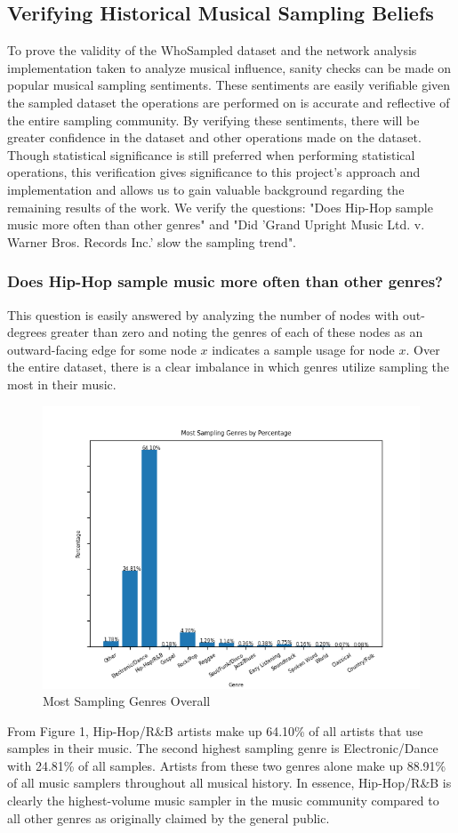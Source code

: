 \documentclass[pageno]{jpaper}
\begin{document}
\subsection{Verifying Historical Musical Sampling Beliefs}
To prove the validity of the WhoSampled dataset and the network analysis implementation taken to analyze musical influence, sanity checks can be made on popular musical sampling sentiments. These sentiments are easily verifiable given the sampled dataset the operations are performed on is accurate and reflective of the entire sampling community. By verifying these sentiments, there will be greater confidence in the dataset and other operations made on the dataset. Though statistical significance is still preferred when performing statistical operations, this verification gives significance to this project's approach and implementation and allows us to gain valuable background regarding the remaining results of the work. We verify the questions: "Does Hip-Hop sample music more often than other genres" and "Did 'Grand Upright Music Ltd. v. Warner Bros. Records Inc.' slow the sampling trend".
\subsubsection{Does Hip-Hop sample music more often than other genres?}
This question is easily answered by analyzing the number of nodes with out-degrees greater than zero and noting the genres of each of these nodes as an outward-facing edge for some node $x$ indicates a sample usage for node $x$. Over the entire dataset, there is a clear imbalance in which genres utilize sampling the most in their music. 
\begin{figure}[H]
\includegraphics{topSamplingGenresPercent}
\caption{Most Sampling Genres Overall}
\label{fig:fig1}
\centering
\end{figure}
From Figure 1, Hip-Hop/R\&B artists make up 64.10\% of all artists that use samples in their music. The second highest sampling genre is Electronic/Dance with 24.81\% of all samples. Artists from these two genres alone make up 88.91\% of all music samplers throughout all musical history. In essence, Hip-Hop/R\&B is clearly the highest-volume music sampler in the music community compared to all other genres as originally claimed by the general public. 
\end{document}
